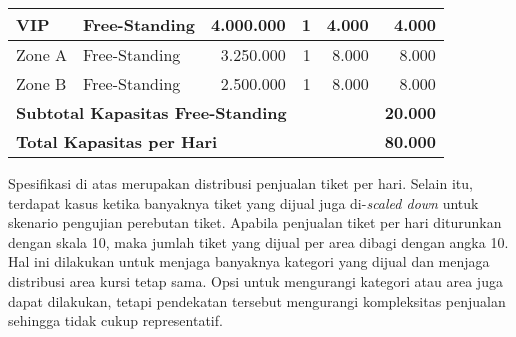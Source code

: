 \begin{longtable}{|l|l|r|r|r|r|}
    VIP                                                             & Free-Standing   & 4.000.000           & 1             & 4.000               & 4.000          \\
    \hline
    Zone A                                                          & Free-Standing   & 3.250.000           & 1             & 8.000               & 8.000          \\
    \hline
    Zone B                                                          & Free-Standing   & 2.500.000           & 1             & 8.000               & 8.000          \\
    \hline
    \multicolumn{5}{|l|}{\textbf{Subtotal Kapasitas Free-Standing}} & \textbf{20.000}                                                                              \\
    \hline \hline

    \multicolumn{5}{|l|}{\textbf{Total Kapasitas per Hari}}         & \textbf{80.000}                                                                              \\
\end{longtable}
\endgroup

Spesifikasi di atas merupakan distribusi penjualan tiket per hari. Selain itu, terdapat kasus ketika banyaknya tiket yang dijual juga di-\textit{scaled down} untuk skenario pengujian perebutan tiket. Apabila penjualan tiket per hari diturunkan dengan skala 10, maka jumlah tiket yang dijual per area dibagi dengan angka 10. Hal ini dilakukan untuk menjaga banyaknya kategori yang dijual dan menjaga distribusi area kursi tetap sama. Opsi untuk mengurangi kategori atau area juga dapat dilakukan, tetapi pendekatan tersebut mengurangi kompleksitas penjualan sehingga tidak cukup representatif.
